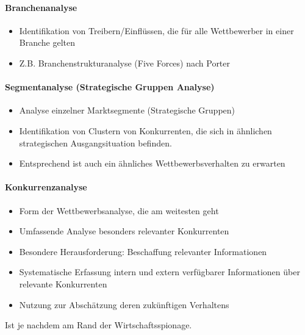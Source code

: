 \paragraph{Branchenanalyse}
\begin{itemize}
	\item Identifikation von Treibern/Einflüssen, die für alle Wettbewerber in einer Branche gelten
	\item Z.B. Branchenstrukturanalyse (Five Forces) nach Porter
\end{itemize}

\paragraph{Segmentanalyse (Strategische Gruppen Analyse)}
\begin{itemize}
	\item Analyse einzelner Marktsegmente (Strategische Gruppen)
	\item Identifikation von Clustern von Konkurrenten, die sich in ähnlichen strategischen Ausgangsituation befinden.
	\item Entsprechend ist auch ein ähnliches Wettbewerbsverhalten zu erwarten
\end{itemize}

\paragraph{Konkurrenzanalyse}
\begin{itemize}
	\item Form der Wettbewerbsanalyse, die am weitesten geht
	\item Umfassende Analyse besonders relevanter Konkurrenten
	\item Besondere Herausforderung: Beschaffung relevanter Informationen
	\item Systematische Erfassung intern und extern verfügbarer Informationen über relevante Konkurrenten
	\item Nutzung zur Abschätzung deren zukünftigen Verhaltens
\end{itemize}
Ist je nachdem am Rand der Wirtschaftsspionage.

